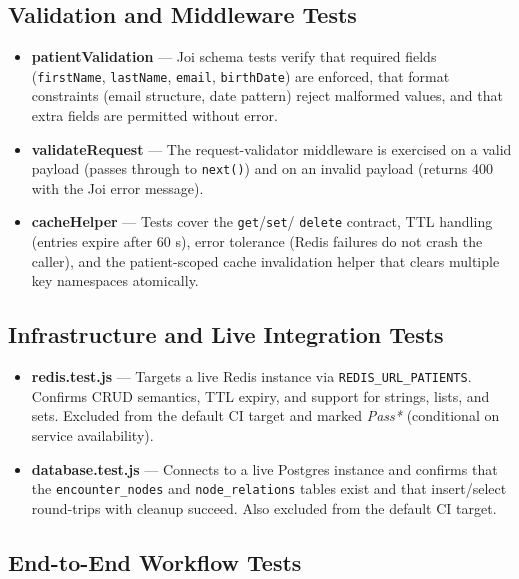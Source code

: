 \subsection{Validation and Middleware Tests}

\begin{itemize}
  \item \textbf{patientValidation} --- Joi schema tests verify that required
        fields (\texttt{firstName}, \texttt{lastName}, \texttt{email},
        \texttt{birthDate}) are enforced, that format constraints (email
        structure, date pattern) reject malformed values, and that extra
        fields are permitted without error.
  \item \textbf{validateRequest} --- The request-validator middleware is exercised
        on a valid payload (passes through to \texttt{next()}) and on an invalid
        payload (returns 400 with the Joi error message).
  \item \textbf{cacheHelper} --- Tests cover the \texttt{get}/\texttt{set}/
        \texttt{delete} contract, TTL handling (entries expire after 60 s),
        error tolerance (Redis failures do not crash the caller), and the
        patient-scoped cache invalidation helper that clears multiple key
        namespaces atomically.
\end{itemize}

\subsection{Infrastructure and Live Integration Tests}

\begin{itemize}
  \item \textbf{redis.test.js} --- Targets a live Redis instance via
        \texttt{REDIS\_URL\_PATIENTS}. Confirms CRUD semantics, TTL expiry,
        and support for strings, lists, and sets. Excluded from the default CI
        target and marked \textit{Pass*} (conditional on service availability).
  \item \textbf{database.test.js} --- Connects to a live Postgres instance and
        confirms that the \texttt{encounter\_nodes} and \texttt{node\_relations}
        tables exist and that insert/select round-trips with cleanup succeed.
        Also excluded from the default CI target.
\end{itemize}

\subsection{End-to-End Workflow Tests}


